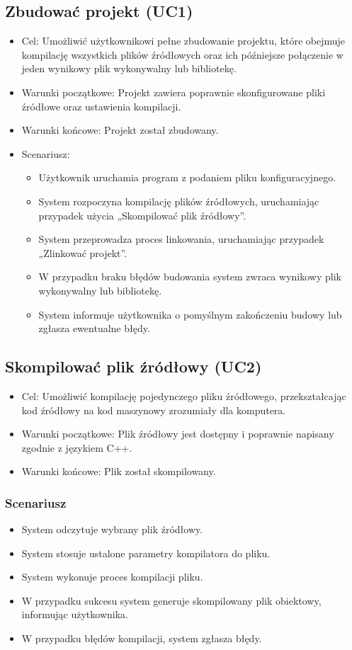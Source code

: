 \subsection{Zbudować projekt (UC1)}
\begin{itemize}
    \item Cel: Umożliwić użytkownikowi pełne zbudowanie projektu, które obejmuje kompilację wszystkich plików źródłowych oraz ich późniejsze połączenie w jeden wynikowy plik wykonywalny lub bibliotekę.
    \item Warunki początkowe: Projekt zawiera poprawnie skonfigurowane pliki źródłowe oraz ustawienia kompilacji.
    \item Warunki końcowe: Projekt został zbudowany.
    \item Scenariusz: 
    \begin{itemize}
    	\item Użytkownik uruchamia program z podaniem pliku konfiguracyjnego.
    	\item System rozpoczyna kompilację plików źródłowych, uruchamiając przypadek użycia „Skompilować plik źródłowy”.
    	\item System przeprowadza proces linkowania, uruchamiając przypadek „Zlinkować projekt”.
    	\item W przypadku braku błędów budowania system zwraca wynikowy plik wykonywalny lub bibliotekę.
    	\item System informuje użytkownika o pomyślnym zakończeniu budowy lub zgłasza ewentualne błędy.
    \end{itemize}
\end{itemize}

\subsection{Skompilować plik źródłowy (UC2)}
\begin{itemize}
    \item Cel: Umożliwić kompilację pojedynczego pliku źródłowego, przekształcając kod źródłowy na kod maszynowy zrozumiały dla komputera.
    \item Warunki początkowe: Plik źródłowy jest dostępny i poprawnie napisany zgodnie z językiem C++.
    \item Warunki końcowe: Plik został skompilowany.
\end{itemize}

\subsubsection{Scenariusz}
\begin{itemize}
    \item System odczytuje wybrany plik źródłowy.
    \item System stosuje ustalone parametry kompilatora do pliku.
    \item System wykonuje proces kompilacji pliku.
    \item W przypadku sukcesu system generuje skompilowany plik obiektowy, informując użytkownika.
    \item W przypadku błędów kompilacji, system zgłasza błędy.
\end{itemize}

